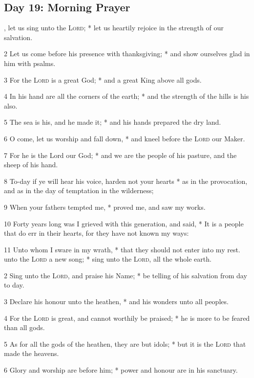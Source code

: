 \subsection{Day 19: Morning Prayer}
, let us sing unto the {\textsc{Lord}}; * let us heartily rejoice in the strength of our salvation.\par
2 Let us come before his presence with thanksgiving; * and show ourselves glad in him with psalms.\par
3 For the {\textsc{Lord}} is a great God; * and a great King above all gods.\par
4 In his hand are all the corners of the earth; * and the strength of the hills is his also.\par
5 The sea is his, and he made it; * and his hands prepared the dry land.\par
6 O come, let us worship and fall down, * and kneel before the {\textsc{Lord}} our Maker.\par
7 For he is the Lord our God; * and we are the people of his pasture, and the sheep of his hand.\par
8 To-day if ye will hear his voice, harden not your hearts * as in the provocation, and as in the day of temptation in the wilderness;\par
9 When your fathers tempted me, * proved me, and saw my works.\par
10 Forty years long was I grieved with this generation, and said, * It is a people that do err in their hearts, for they have not known my ways:\par
11 Unto whom I sware in my wrath, * that they should not enter into my rest.
 unto the {\textsc{Lord}} a new song; * sing unto the {\textsc{Lord}}, all the whole earth.\par
2 Sing unto the {\textsc{Lord}}, and praise his Name; * be telling of his salvation from day to day.\par
3 Declare his honour unto the heathen, * and his wonders unto all peoples.\par
4 For the {\textsc{Lord}} is great, and cannot worthily be praised; * he is more to be feared than all gods.\par
5 As for all the gods of the heathen, they are but idols; * but it is the {\textsc{Lord}} that made the heavens.\par
6 Glory and worship are before him; * power and honour are in his sanctuary.\par
